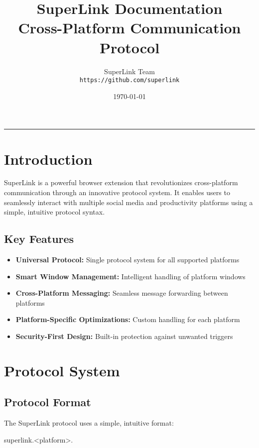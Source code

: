 \documentclass[12pt]{article}
\title{\Huge\textbf{SuperLink Documentation}\\[0.5em]
\large Cross-Platform Communication Protocol}
\author{SuperLink Team\\[0.5em]
\small\texttt{https://github.com/superlink}}
\date{\today}
\begin{document}
\maketitle
\begin{center}
\rule{0.8\textwidth}{0.4pt}
\end{center}

\tableofcontents
\newpage

\section{Introduction}
\begin{infobox}
SuperLink is a powerful browser extension that revolutionizes cross-platform communication through an innovative protocol system. It enables users to seamlessly interact with multiple social media and productivity platforms using a simple, intuitive protocol syntax.
\end{infobox}

\subsection{Key Features}
\begin{itemize}[leftmargin=*]
    \item \textbf{Universal Protocol:} Single protocol system for all supported platforms
    \item \textbf{Smart Window Management:} Intelligent handling of platform windows
    \item \textbf{Cross-Platform Messaging:} Seamless message forwarding between platforms
    \item \textbf{Platform-Specific Optimizations:} Custom handling for each platform
    \item \textbf{Security-First Design:} Built-in protection against unwanted triggers
\end{itemize}

\section{Protocol System}
\subsection{Protocol Format}
The SuperLink protocol uses a simple, intuitive format:
\begin{codebox}
superlink.<platform>.
\end{codebox}
\end{document}
